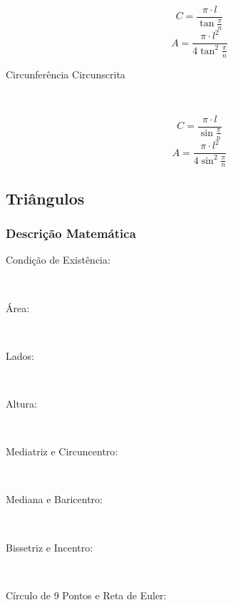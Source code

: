 \begin{description}
                \begin{multicols}{2}
                    \noindent\[ C = \frac{\pi \cdot l}{\tan{\frac{\pi}{n}}} \]
                    \[ A = \frac{\pi \cdot l^2}{4\tan^2{\frac{\pi}{n}}} \]
                \end{multicols}
            \item[Circunferência Circunscrita] \hfill \\
                \begin{multicols}{2}
                    \noindent\[ C = \frac{\pi \cdot l}{\sin{\frac{\pi}{n}}} \]
                    \[ A = \frac{\pi \cdot l^2}{4\sin^2{\frac{\pi}{n}}} \]
                \end{multicols}
        \end{description}
\subsection{Triângulos}
    \subsubsection{Descrição Matemática}
        \begin{center}
            \begin{tikzpicture}
                
            \end{tikzpicture}
        \end{center}
        \begin{description}
            \item[Condição de Existência:] \hfill \\
            \item[Área:] \hfill \\
            \item[Lados:] \hfill \\
            \item[Altura:] \hfill \\
            \item[Mediatriz e Circuncentro:] \hfill \\
            \item[Mediana e Baricentro:] \hfill \\
            \item[Bissetriz e Incentro:] \hfill \\
            \item[Círculo de 9 Pontos e Reta de Euler:] \hfill \\
        \end{description}
